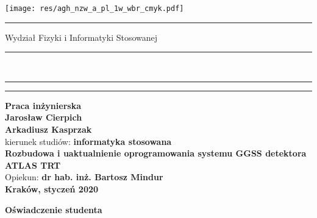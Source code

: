 \documentclass[11pt]{aghdpl}
\author{Jarosław Cierpich \and Arkadiusz Kasprzak}
\date{2019/2020}
\begin{document}

\thispagestyle{empty}

\texttt{[image: res/agh\_nzw\_a\_pl\_1w\_wbr\_cmyk.pdf]}\\
\rule{30mm}{0pt}
{\Large\textsf{Wydział Fizyki i Informatyki Stosowanej}}\\
\rule{\textwidth}{3pt}\\
\rule[2.75ex]
{\textwidth}{1pt}%
\vspace{1em}\rule{30mm}{0pt}
\begin{center}
    {\bf\LARGE\textsf{Praca inżynierska}}\\
    \vspace{13ex}
    {\bf\Large\textsf{Jarosław Cierpich \\ Arkadiusz Kasprzak}}\\
    \vspace{3ex}
    {\sf \small kierunek studiów:} {\bf\small\textsf{informatyka stosowana}}\\
    \vspace{15ex}
    {\bf\huge\textsf{Rozbudowa i uaktualnienie oprogramowania systemu GGSS detektora ATLAS TRT}}\\
    \vspace{14ex}
    {\sf \Large Opiekun:} {\bf\Large\textsf{dr hab. inż. Bartosz Mindur}}\\
    \vspace{22ex}
    \textsf{\bf\large\textsf{Kraków, styczeń 2020}}
\end{center}

\newpage

\begin{center}
	{\bf\large\textsf{Oświadczenie studenta}}
\end{center}
\end{document}
